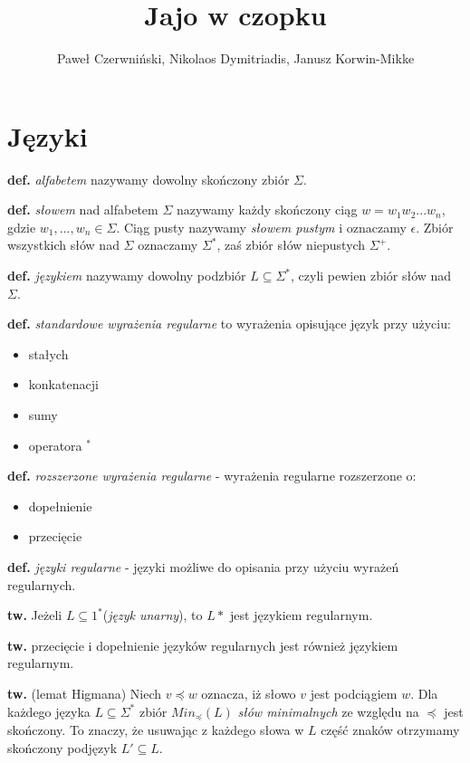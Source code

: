 \documentclass{article}
\title{Jajo w czopku}
\author{Paweł Czerwniński, Nikolaos Dymitriadis, Janusz Korwin-Mikke}
\begin{document}
\maketitle

\section{Języki}
	\textbf{def.} \textit{alfabetem} nazywamy dowolny skończony zbiór $\Sigma$.
	
	\textbf{def.} \textit{słowem} nad alfabetem $\Sigma$ nazywamy każdy skończony ciąg $w = w_1 w_2 ... w_n$, gdzie $w_1,..., w_n \in \Sigma$. Ciąg pusty nazywamy \textit{słowem pustym} i oznaczamy $\epsilon$. Zbiór wszystkich słów nad $\Sigma$ oznaczamy $\Sigma^*$, zaś zbiór słów niepustych $\Sigma^+$.
	
	\textbf{def.} \textit{językiem} nazywamy dowolny podzbiór $L \subseteq \Sigma^*$, czyli pewien zbiór słów nad $\Sigma$.
	
	\textbf{def.}  \textit{standardowe wyrażenia regularne} to wyrażenia opisujące język przy użyciu:
	\begin{itemize}
		\item stałych
		\item konkatenacji
		\item sumy
		\item operatora $^*$
	\end{itemize}
	
	\textbf{def.} \textit{rozszerzone wyrażenia regularne} - wyrażenia regularne rozszerzone o:
	\begin{itemize}
		\item dopełnienie
		\item przecięcie
	\end{itemize}
	
	\textbf{def.} \textit{języki regularne} - języki możliwe do opisania przy użyciu wyrażeń regularnych.
	
	\textbf{tw.} Jeżeli $L \subseteq 1^*$(\textit{język unarny}), to $L*$ jest językiem regularnym.
	
	\textbf{tw.} przecięcie i dopełnienie języków regularnych jest również językiem regularnym.
	
	\textbf{tw.} (lemat Higmana) Niech $v \preceq w$ oznacza, iż słowo $v$ jest podciągiem $w$. Dla każdego języka $L \subseteq \Sigma^*$ zbiór $Min_\preceq(L)$ \textit{słów minimalnych} ze względu na $\preceq$ jest skończony. To znaczy, że usuwając z każdego słowa w $L$ część znaków otrzymamy skończony podjęzyk $L' \subseteq L$.
	
\end{document}
